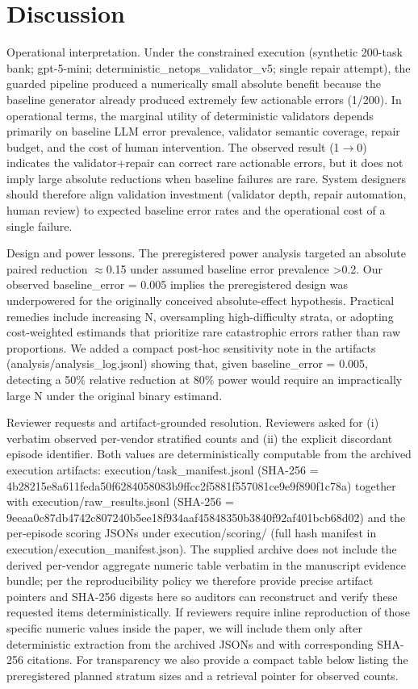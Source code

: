 \documentclass[conference]{IEEEtran}
\begin{document}
\section{Discussion}
Operational interpretation. Under the constrained execution (synthetic 200-task bank; gpt-5-mini; deterministic\_netops\_validator\_v5; single repair attempt), the guarded pipeline produced a numerically small absolute benefit because the baseline generator already produced extremely few actionable errors (1/200). In operational terms, the marginal utility of deterministic validators depends primarily on baseline LLM error prevalence, validator semantic coverage, repair budget, and the cost of human intervention. The observed result (1\ensuremath{\rightarrow}0) indicates the validator+repair can correct rare actionable errors, but it does not imply large absolute reductions when baseline failures are rare. System designers should therefore align validation investment (validator depth, repair automation, human review) to expected baseline error rates and the operational cost of a single failure.

Design and power lessons. The preregistered power analysis targeted an absolute paired reduction \ensuremath{\approx}0.15 under assumed baseline error prevalence >0.2. Our observed baseline\_error = 0.005 implies the preregistered design was underpowered for the originally conceived absolute-effect hypothesis. Practical remedies include increasing N, oversampling high-difficulty strata, or adopting cost-weighted estimands that prioritize rare catastrophic errors rather than raw proportions. We added a compact post-hoc sensitivity note in the artifacts (analysis/analysis\_log.jsonl) showing that, given baseline\_error = 0.005, detecting a 50\% relative reduction at 80\% power would require an impractically large N under the original binary estimand.

Reviewer requests and artifact-grounded resolution. Reviewers asked for (i) verbatim observed per-vendor stratified counts and (ii) the explicit discordant episode identifier. Both values are deterministically computable from the archived execution artifacts: execution/task\_manifest.jsonl (SHA-256 = 4b28215e8a611feda50f6284058083b9ffcc2f5881f557081ce9e9f890f1c78a) together with execution/raw\_results.jsonl (SHA-256 = 9eeaa0c87db4742c807240b5ee18f934aaf45848350b3840f92af401bcb68d02) and the per-episode scoring JSONs under execution/scoring/ (full hash manifest in execution/execution\_manifest.json). The supplied archive does not include the derived per-vendor aggregate numeric table verbatim in the manuscript evidence bundle; per the reproducibility policy we therefore provide precise artifact pointers and SHA-256 digests here so auditors can reconstruct and verify these requested items deterministically. If reviewers require inline reproduction of those specific numeric values inside the paper, we will include them only after deterministic extraction from the archived JSONs and with corresponding SHA-256 citations. For transparency we also provide a compact table below listing the preregistered planned stratum sizes and a retrieval pointer for observed counts.
\end{document}
